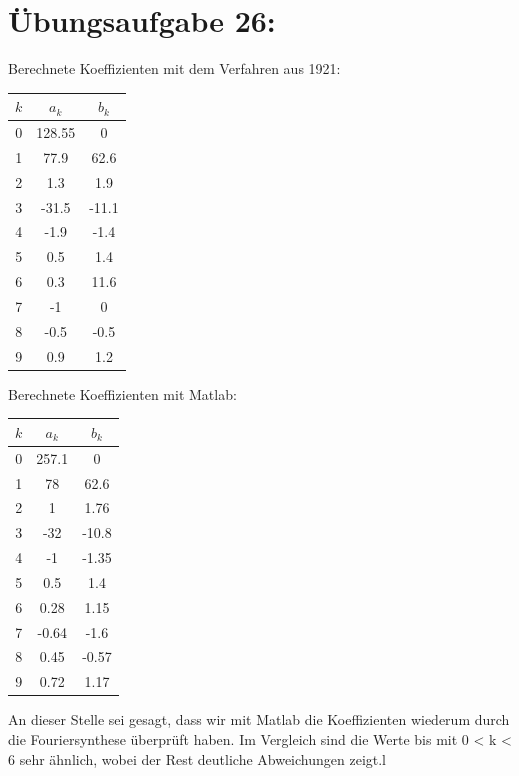 	\section*{Übungsaufgabe 26:}
	Berechnete Koeffizienten mit dem Verfahren aus 1921:\newline
	\begin{center}
		\begin{tabular}{|c|c|c|}
			\hline 
			$k$ & $a_k$ & $b_k$ \\
			\hline
			0   &  128.55    & 0 \\
			1   &  77.9    & 62.6 \\
			2   &  1.3    & 1.9 \\
			3   &  -31.5    & -11.1 \\
			4   &  -1.9    & -1.4 \\
			5   &  0.5    & 1.4 \\
			6   &  0.3    & 11.6 \\
			7   &  -1    & 0 \\
			8   &  -0.5    & -0.5 \\
			9   &  0.9    & 1.2 \\
			\hline
		\end{tabular}
	\end{center}
	Berechnete Koeffizienten mit Matlab:
	\begin{center}
		\begin{tabular}{|c|c|c|}
			\hline 
			$k$ & $a_k$ & $b_k$ \\
			\hline
			0   &  257.1    & 0 \\
			1   &  78    & 62.6 \\
			2   &  1    & 1.76 \\
			3   &  -32    & -10.8 \\
			4   &  -1    & -1.35 \\
			5   &  0.5    & 1.4 \\
			6   &  0.28    & 1.15 \\
			7   &  -0.64    & -1.6 \\
			8   &  0.45    & -0.57 \\
			9   &  0.72    & 1.17 \\
			\hline
		\end{tabular}
	\end{center}
	An dieser Stelle sei gesagt, dass wir mit Matlab die Koeffizienten wiederum durch die Fouriersynthese überprüft haben.
	Im Vergleich sind die Werte bis mit 0 < k < 6 sehr ähnlich, wobei der Rest deutliche Abweichungen zeigt.l
	
\newpage